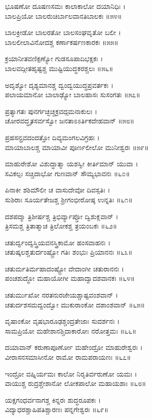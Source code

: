ಭೂಷಣೋ ದೂಷಣಸಮಃ ಕಾಲಾಕಾಲೋ ದಯಾನಿಧಿಃ ।\\
ಬಾಲಪ್ರಿಯೋ ಬಾಲರುಚಿರ್ಬಾಲವಾನತಿಬಾಲಕಃ ॥೫೪॥

ಬಾಲಕ್ರೀಡೋ ಬಾಲರತೋ ಬಾಲಸಂಘವೃತೋ ಬಲೀ ।\\
ಬಾಲಲೀಲಾವಿನೋದಶ್ಚ ಕರ್ಣಾಕರ್ಷಣಕಾರಕಃ ॥೫೫॥

ಕ್ರಯಾನೀತವಣಿಕ್ಪಣ್ಯೋ ಗುಡಸೂಪಾದಿಭಕ್ಷಕಃ ।\\
ಬಾಲವದ್ಗೀತಹೃಷ್ಟಶ್ಚ ಮುಷ್ಟಿಯುದ್ಧಕರಶ್ಚಲಃ ॥೫೬॥

ಅದೃಶ್ಯೋ ದೃಶ್ಯಮಾನಶ್ಚ ದ್ವಂದ್ವಯುದ್ಧಪ್ರವರ್ತಕಃ ।\\
ಪಲಾಯಮಾನೋ ಬಾಲಾಢ್ಯೋ ಬಾಲಹಾಸಃ ಸುಸಂಗತಃ ॥೫೭॥

ಪ್ರತ್ಯಾಗತಃ ಪುನರ್ಗಚ್ಛಚ್ಚಕ್ರವದ್ಗಮನಾಕುಲಃ ।\\
ಚೋರವದ್ಧೃತಸರ್ವಸ್ವೋ ಜನತಾಽಽರ್ತಿಕದೇಹವಾನ್ ॥೫೮॥

ಪ್ರಹಸನ್ಪ್ರವದಂದತ್ತೋ ದಿವ್ಯಮಂಗಲವಿಗ್ರಹಃ ।\\
ಮಾಯಾಬಾಲಶ್ಚ ಮಾಯಾವೀ ಪೂರ್ಣಲೀಲೋ ಮುನೀಶ್ವರಃ ॥೫೯॥

ಮಾಹುರೇಶೋ ವಿಶುದ್ಧಾತ್ಮಾ ಯಶಸ್ವೀ ಕೀರ್ತಿಮಾನ್ ಯುವಾ ।\\
ಸವಿಕಲ್ಪಃ ಸಚ್ಚಿದಾಭೋ ಗುಣವಾನ್ ಸೌಮ್ಯಭಾವನಃ ॥೬೦॥

ಪಿನಾಕೀ ಶಶಿಮೌಲೀ ಚ ವಾಸುದೇವೋ ದಿವಸ್ಪತಿಃ ।\\
ಸುಶಿರಾಃ ಸೂರ್ಯತೇಜಶ್ಚ ಶ್ರೀಗಂಭೀರೋಷ್ಠ ಉನ್ನತಿಃ ॥೬೧॥

ದಶಪದ್ಮಾ ತ್ರಿಶೀರ್ಷಶ್ಚ ತ್ರಿಭಿರ್ವ್ಯಾಪ್ತೋ ದ್ವಿಶುಕ್ಲವಾನ್ ।\\
ತ್ರಿಸಮಶ್ಚ ತ್ರಿತಾತ್ಮಾಚ ತ್ರಿಲೋಕಶ್ಚ ತ್ರಯಂಬಕಃ ॥೬೨॥

ಚತುರ್ದ್ವಂದ್ವಸ್ತ್ರಿಯವನಸ್ತ್ರಿಕಾಮೋ ಹಂಸವಾಹನಃ ।\\
ಚತುಷ್ಕಲಶ್ಚತುರ್ದಂಷ್ಟ್ರೋ ಗತಿಃ ಶಂಭುಃ ಪ್ರಿಯಾನನಃ ॥೬೩॥

ಚತುರ್ಮತಿರ್ಮಹಾದಂಷ್ಟ್ರೋ ವೇದಾಂಗೀ ಚತುರಾನನಃ ।\\
ಪಂಚಶುದ್ಧೋ ಮಹಾಯೋಗೀ ಮಹಾದ್ವಾದಶವಾನಕಃ ॥೬೪॥

ಚತುರ್ಮುಖೋ ನರತನುರಜೇಯಶ್ಚಾಷ್ಟವಂಶವಾನ್ ।\\
ಚತುರ್ದಶಸಮದ್ವಂದ್ವೋ ಮುಕುರಾಂಕೋ ದಶಾಂಶವಾನ್ ॥೬೫॥

ವೃಷಾಂಕೋ ವೃಷಭಾರೂಢಶ್ಚಂದ್ರತೇಜಾಃ ಸುದರ್ಶನಃ ।\\
ಸಾಮಪ್ರಿಯೋ ಮಹೇಶಾನಶ್ಚಿದಾಕಾರೋಃ ನರೋತ್ತಮಃ ॥೬೬॥

ದಯಾವಾನ್ ಕರುಣಾಪೂರ್ಣೋ ಮಹೇಂದ್ರೋ ಮಾಹುರೇಶ್ವರಃ ।\\
ವೀರಾಸನಸಮಾಸೀನೋ ರಾಮೋ ರಾಮಪರಾಯಣಃ ॥೬೭॥

ಇಂದ್ರೋ ವಹ್ನಿರ್ಯಮಃ ಕಾಲೋ ನಿರೃತಿರ್ವರುಣೋ ಯಮಃ ।\\
ವಾಯುಶ್ಚ ರುದ್ರಶ್ಚೇಶಾನೋ ಲೋಕಪಾಲೋ ಮಹಾಯಶಾಃ ॥೬೮॥

ಯಕ್ಷಗಂಧರ್ವನಾಗಶ್ಚ ಕಿನ್ನರಃ ಶುದ್ಧರೂಪಕಃ ।\\
ವಿದ್ಯಾಧರಶ್ಚಾಹಿಪತಿಶ್ಚಾರಣಃ ಪನ್ನಗೇಶ್ವರಃ ॥೬೯॥

